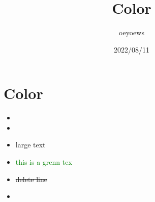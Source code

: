 \documentclass[UTF8]{article}
\title{Color}
\author{oeyoews}
\date{2022/08/11}
\begin{document}
\maketitle

\section{Color}

\begin{itemize}

	\item {}
	\item {}
	\item \huge{large text}
	\item \textcolor{green}{this is a grenn tex}
	\item \sout{delete line}
	\item {}

\end{itemize}
\end{document}

